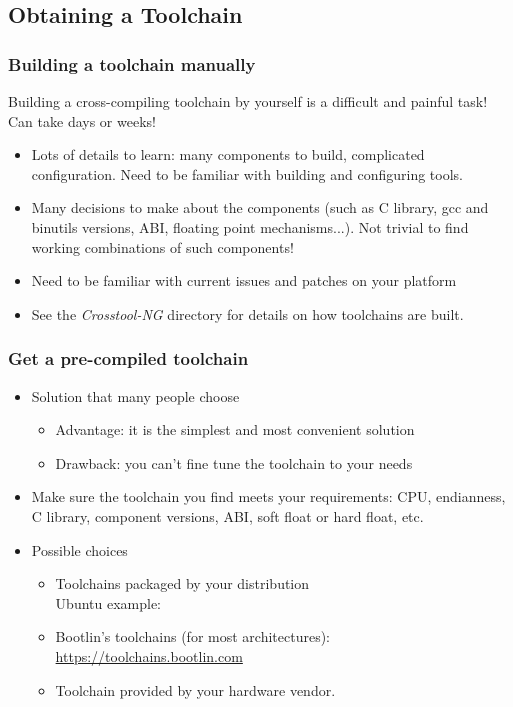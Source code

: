 \subsection{Obtaining a Toolchain}

\begin{frame}
  \frametitle{Building a toolchain manually}

  Building a cross-compiling toolchain by yourself is a difficult and painful
  task! Can take days or weeks!
  \begin{itemize}
  \item Lots of details to learn: many components to build, complicated
    configuration. Need to be familiar with building and configuring tools.
  \item Many decisions to make about the components (such as C library,
        gcc and binutils versions, ABI, floating point mechanisms...). Not
	trivial to find working combinations of such components!
  \item Need to be familiar with current  issues and patches
    on your platform
  \item See the {\em Crosstool-NG}  directory for details
    on how toolchains are built.
\end{itemize}
\end{frame}

\begin{frame}
  \frametitle{Get a pre-compiled toolchain}
  \begin{itemize}
  \item Solution that many people choose
    \begin{itemize}
    \item Advantage: it is the simplest and most convenient solution
    \item Drawback: you can't fine tune the toolchain to your needs
    \end{itemize}
  \item Make sure the toolchain you find meets your requirements:
    CPU, endianness, C library, component versions, ABI, soft float
    or hard float, etc.
  \item Possible choices
    \begin{itemize}
    \item Toolchains packaged by your distribution\\
	  Ubuntu example:\\
    \item Bootlin's toolchains (for most architectures):
          \url{https://toolchains.bootlin.com}
    \item Toolchain provided by your hardware vendor.
    \end{itemize}
  \end{itemize}
\end{frame}

